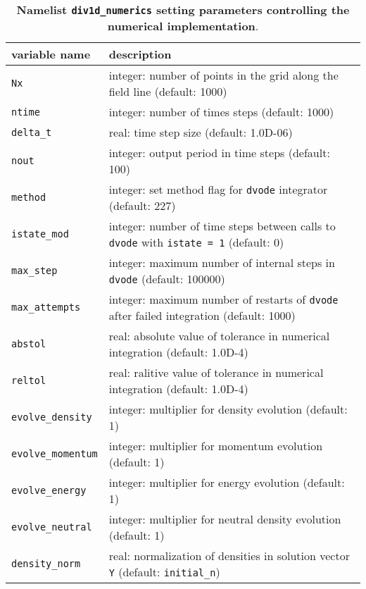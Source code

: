 \documentclass[amsmath,amssymb,a4]{revtex4-2}
\begin{document}
\begin{table}[h]
\begin{center}
  \caption{{\bf Namelist {\tt div1d\_numerics} setting parameters controlling the numerical implementation}.}
  \label{tab:input_numerics}
  \begin{tabular}{|| l  | l ||}
    \hline\hline
    variable name                & description \\ \hline\hline
    {\tt Nx}                     & integer: number of points in the grid along the field line (default: 1000) \\ \hline
    {\tt ntime}                  & integer: number of times steps (default: 1000)  \\ \hline
    {\tt delta\_t}               & real: time step size (default: 1.0D-06)  \\ \hline
    {\tt nout}                   & integer: output period in time steps (default: 100) \\ \hline
    {\tt method}                 & integer: set method flag for {\tt dvode} integrator (default: 227)   \\ \hline
	{\tt istate\_mod}            & integer: number of time steps between calls to {\tt dvode} with {\tt istate = 1} (default: 0) \\ \hline
	{\tt max\_step}              & integer: maximum number of internal steps in {\tt dvode} (default: 100000) \\ \hline
	{\tt max\_attempts}          & integer: maximum number of restarts of {\tt dvode} after failed integration (default: 1000) \\ \hline
    {\tt abstol}                 & real: absolute value of tolerance in numerical integration (default: 1.0D-4)  \\ \hline
    {\tt reltol}                 & real: ralitive value of tolerance in numerical integration (default: 1.0D-4)  \\ \hline
	{\tt evolve\_density}        & integer: multiplier for density evolution (default: 1) \\ \hline
	{\tt evolve\_momentum}       & integer: multiplier for momentum evolution (default: 1) \\ \hline
	{\tt evolve\_energy}         & integer: multiplier for energy evolution (default: 1) \\ \hline
	{\tt evolve\_neutral}        & integer: multiplier for neutral density evolution (default: 1) \\ \hline
	{\tt density\_norm}          & real: normalization of densities in solution vector {\tt Y} (default: {\tt initial\_n}) \\ \hline

\end{tabular}
\end{center}
\end{table}
\end{document}
